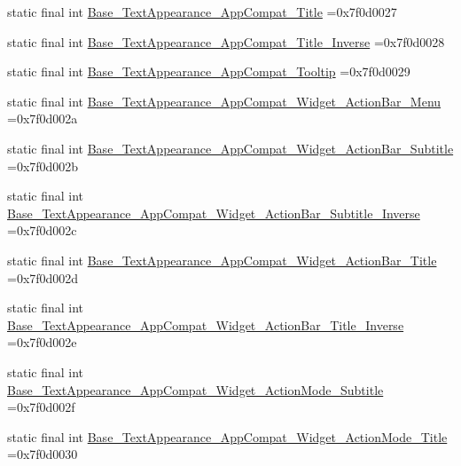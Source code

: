 \begin{DoxyCompactItemize}
\item 
static final int \mbox{\hyperlink{classcom_1_1example_1_1trainawearapplication_1_1_r_1_1style_a563a1410d4ce5a3075a09ac1da9dad07}{Base\+\_\+\+Text\+Appearance\+\_\+\+App\+Compat\+\_\+\+Title}} =0x7f0d0027
\item 
static final int \mbox{\hyperlink{classcom_1_1example_1_1trainawearapplication_1_1_r_1_1style_a885511151e7272f69836b447f916de64}{Base\+\_\+\+Text\+Appearance\+\_\+\+App\+Compat\+\_\+\+Title\+\_\+\+Inverse}} =0x7f0d0028
\item 
static final int \mbox{\hyperlink{classcom_1_1example_1_1trainawearapplication_1_1_r_1_1style_a6bbf8dd9f6bb6ecbd7ef187b7031c9b1}{Base\+\_\+\+Text\+Appearance\+\_\+\+App\+Compat\+\_\+\+Tooltip}} =0x7f0d0029
\item 
static final int \mbox{\hyperlink{classcom_1_1example_1_1trainawearapplication_1_1_r_1_1style_a7947f13ffc82420d12d71a5274ed8073}{Base\+\_\+\+Text\+Appearance\+\_\+\+App\+Compat\+\_\+\+Widget\+\_\+\+Action\+Bar\+\_\+\+Menu}} =0x7f0d002a
\item 
static final int \mbox{\hyperlink{classcom_1_1example_1_1trainawearapplication_1_1_r_1_1style_a1a15e9ee698839c3258c70bc9edc31fe}{Base\+\_\+\+Text\+Appearance\+\_\+\+App\+Compat\+\_\+\+Widget\+\_\+\+Action\+Bar\+\_\+\+Subtitle}} =0x7f0d002b
\item 
static final int \mbox{\hyperlink{classcom_1_1example_1_1trainawearapplication_1_1_r_1_1style_aab4ee7a07486498cdfba570a9beee86d}{Base\+\_\+\+Text\+Appearance\+\_\+\+App\+Compat\+\_\+\+Widget\+\_\+\+Action\+Bar\+\_\+\+Subtitle\+\_\+\+Inverse}} =0x7f0d002c
\item 
static final int \mbox{\hyperlink{classcom_1_1example_1_1trainawearapplication_1_1_r_1_1style_a3cdf5fac5da838e363674fe0c7416ee7}{Base\+\_\+\+Text\+Appearance\+\_\+\+App\+Compat\+\_\+\+Widget\+\_\+\+Action\+Bar\+\_\+\+Title}} =0x7f0d002d
\item 
static final int \mbox{\hyperlink{classcom_1_1example_1_1trainawearapplication_1_1_r_1_1style_a60cba9375aa78ad0e0d4c0118c3b5135}{Base\+\_\+\+Text\+Appearance\+\_\+\+App\+Compat\+\_\+\+Widget\+\_\+\+Action\+Bar\+\_\+\+Title\+\_\+\+Inverse}} =0x7f0d002e
\item 
static final int \mbox{\hyperlink{classcom_1_1example_1_1trainawearapplication_1_1_r_1_1style_ae4c9b83c28eabf0111bad2037a7e1f20}{Base\+\_\+\+Text\+Appearance\+\_\+\+App\+Compat\+\_\+\+Widget\+\_\+\+Action\+Mode\+\_\+\+Subtitle}} =0x7f0d002f
\item 
static final int \mbox{\hyperlink{classcom_1_1example_1_1trainawearapplication_1_1_r_1_1style_a2157fb271116fb6a71f495ca373ec9d2}{Base\+\_\+\+Text\+Appearance\+\_\+\+App\+Compat\+\_\+\+Widget\+\_\+\+Action\+Mode\+\_\+\+Title}} =0x7f0d0030

\end{DoxyCompactItemize}
